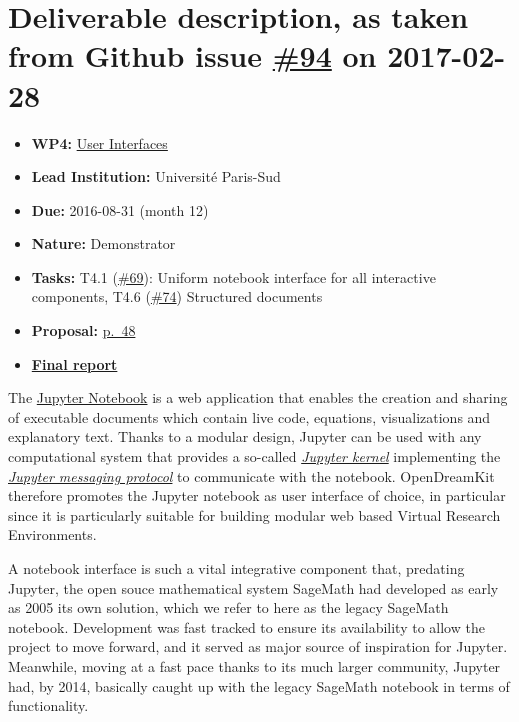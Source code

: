 \section*{\texorpdfstring{Deliverable description, as taken from Github
issue
\href{https://github.com/OpenDreamKit/OpenDreamKit/issues/94}{\#94} on
2017-02-28}{Deliverable description, as taken from Github issue \#94 on 2017-02-28}}\label{deliverable-description-as-taken-from-github-issue-94-on-2017-02-28}

\begin{itemize}
\tightlist
\item
  \textbf{WP4:}
  \href{https://github.com/OpenDreamKit/OpenDreamKit/tree/master/WP4}{User
  Interfaces}
\item
  \textbf{Lead Institution:} Université Paris-Sud
\item
  \textbf{Due:} 2016-08-31 (month 12)
\item
  \textbf{Nature:} Demonstrator
\item
  \textbf{Tasks:} T4.1
  (\href{https://github.com/OpenDreamKit/OpenDreamKit/issues/69}{\#69}):
  Uniform notebook interface for all interactive components, T4.6
  (\href{https://github.com/OpenDreamKit/OpenDreamKit/issues/74}{\#74})
  Structured documents
\item
  \textbf{Proposal:}
  \href{https://github.com/OpenDreamKit/OpenDreamKit/raw/master/Proposal/proposal-www.pdf}{p.~48}
\item
  \textbf{\href{https://github.com/OpenDreamKit/OpenDreamKit/raw/master/WP4/D4.5/report-final.pdf}{Final
  report}}
\end{itemize}

The \href{https://jupyter.org}{Jupyter Notebook} is a web application
that enables the creation and sharing of executable documents which
contain live code, equations, visualizations and explanatory text.
Thanks to a modular design, Jupyter can be used with any computational
system that provides a so-called
\href{https://jupyter.readthedocs.io/en/latest/projects/kernels.html}{\emph{Jupyter
kernel}} implementing the
\href{https://jupyter-client.readthedocs.io/en/latest/}{\emph{Jupyter
messaging protocol}} to communicate with the notebook. OpenDreamKit
therefore promotes the Jupyter notebook as user interface of choice, in
particular since it is particularly suitable for building modular web
based Virtual Research Environments.

A notebook interface is such a vital integrative component that,
predating Jupyter, the open souce mathematical system SageMath had
developed as early as 2005 its own solution, which we refer to here as
the legacy SageMath notebook. Development was fast tracked to ensure its
availability to allow the project to move forward, and it served as
major source of inspiration for Jupyter. Meanwhile, moving at a fast
pace thanks to its much larger community, Jupyter had, by 2014,
basically caught up with the legacy SageMath notebook in terms of
functionality.

